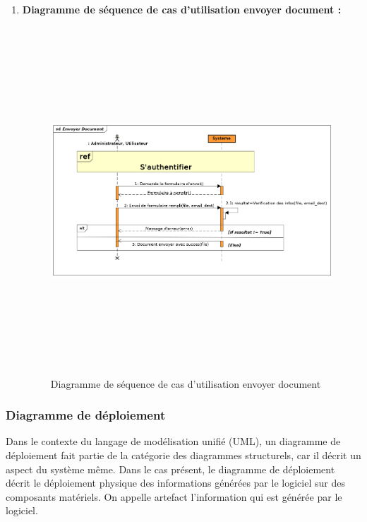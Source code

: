 \begin{enumerate}
		 	
		 		\item \textbf{Diagramme de séquence de cas d'utilisation envoyer document :}
		 	\begin{figure}[H]
		 		\centering
		 		\includegraphics[width=18cm, height=13cm]{../Diagrammes/DiagrammeSequences/EnvoyerDocument.png}
		 		\caption{Diagramme de séquence de cas d'utilisation envoyer document}
		 		\label{diaseq6}
		 	\end{figure}
		 	
		 	
		 \end{enumerate}

		\subsubsection{Diagramme de déploiement}
	
			Dans le contexte du langage de modélisation unifié (UML), un diagramme de déploiement fait partie de la catégorie des diagrammes structurels, car il décrit un aspect du système même. Dans le cas présent, le diagramme de déploiement décrit le déploiement physique des informations générées par le logiciel sur des composants matériels. On appelle artefact l'information qui est générée par le logiciel\cite{deplymentid}.
			
